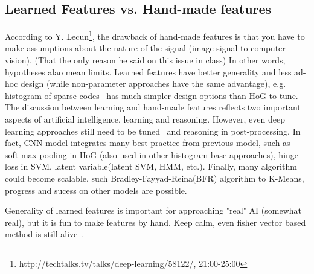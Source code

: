 \documentclass[12pt]{article}
\begin{document}
\subsection{Learned Features vs. Hand-made features}
According to Y. Lecun\footnote{http://techtalks.tv/talks/deep-learning/58122/, 21:00-25:00}, the drawback of hand-made features is that you have to make assumptions about the nature of the signal (image signal to computer vision). (That the only reason he said on this issue in class) In other words, hypotheses alao mean limits. Learned features have better generality and less ad-hoc design (while non-parameter approaches have the same advantage), e.g. histogram of sparse codes~\citep{ren2013histograms} has much simpler design options than HoG to tune. The discussion between learning and hand-made features reflects two important aspects of artificial intelligence, learning and reasoning. However, even deep learning approaches still need to be tuned~\citep{finetune14berkeley} and reasoning in post-processing. In fact, CNN model integrates many best-practice from previous model, such as soft-max pooling in HoG (also used in other histogram-base approaches), hinge-loss in SVM, latent variable(latent SVM, HMM, etc.). Finally, many algorithm could become scalable, such Bradley-Fayyad-Reina(BFR) algorithm to K-Means, progress and sucess on other models are possible.

Generality of learned features is important for approaching "real" AI (somewhat real), but it is fun to make features by hand. Keep calm, even fisher vector based method is still alive~\citep{ILSVRC}.



%

\end{document}
